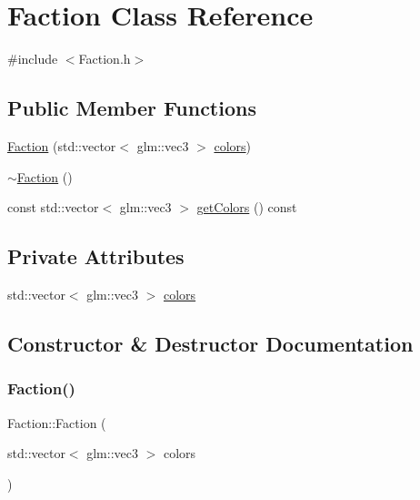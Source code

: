 \hypertarget{class_faction}{}\section{Faction Class Reference}
\label{class_faction}


{\ttfamily \#include $<$Faction.\+h$>$}

\subsection*{Public Member Functions}
\begin{DoxyCompactItemize}
\item 
\hyperlink{class_faction_acf37cad6b6550598d9c59980f95206a3}{Faction} (std\+::vector$<$ glm\+::vec3 $>$ \hyperlink{class_faction_a8f17ebea80da83ae86c9a1a518462ea5}{colors})
\item 
\hyperlink{class_faction_a83ef1c6c68945eb21dcc104196b06a84}{$\sim$\+Faction} ()
\item 
const std\+::vector$<$ glm\+::vec3 $>$ \hyperlink{class_faction_a302367858679b7700c27bcdd2582e91b}{get\+Colors} () const
\end{DoxyCompactItemize}
\subsection*{Private Attributes}
\begin{DoxyCompactItemize}
\item 
std\+::vector$<$ glm\+::vec3 $>$ \hyperlink{class_faction_a8f17ebea80da83ae86c9a1a518462ea5}{colors}
\end{DoxyCompactItemize}


\subsection{Constructor \& Destructor Documentation}
\mbox{\label{class_faction_acf37cad6b6550598d9c59980f95206a3}} 
\subsubsection{\texorpdfstring{Faction()}{Faction()}}
{\footnotesize\ttfamily Faction\+::\+Faction (\begin{DoxyParamCaption}\item[{std\+::vector$<$ glm\+::vec3 $>$}]{colors }\end{DoxyParamCaption})}

